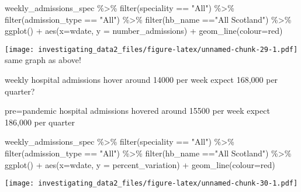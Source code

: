 \documentclass[
]{article}
\newenvironment{Shaded}{\begin{snugshade}}{\end{snugshade}}
\newcommand{\AttributeTok}[1]{\textcolor[rgb]{0.77,0.63,0.00}{#1}}
\newcommand{\FunctionTok}[1]{\textcolor[rgb]{0.00,0.00,0.00}{#1}}
\newcommand{\NormalTok}[1]{#1}
\newcommand{\SpecialCharTok}[1]{\textcolor[rgb]{0.00,0.00,0.00}{#1}}
\newcommand{\StringTok}[1]{\textcolor[rgb]{0.31,0.60,0.02}{#1}}
\begin{document}
\begin{Shaded}
\begin{Highlighting}[]
\NormalTok{weekly\_admissions\_spec }\SpecialCharTok{\%\textgreater{}\%} 
  \FunctionTok{filter}\NormalTok{(speciality }\SpecialCharTok{==} \StringTok{"All"}\NormalTok{) }\SpecialCharTok{\%\textgreater{}\%} 
  \FunctionTok{filter}\NormalTok{(admission\_type }\SpecialCharTok{==} \StringTok{"All"}\NormalTok{) }\SpecialCharTok{\%\textgreater{}\%} 
  \FunctionTok{filter}\NormalTok{(hb\_name }\SpecialCharTok{==}\StringTok{"All Scotland"}\NormalTok{) }\SpecialCharTok{\%\textgreater{}\%} 
\FunctionTok{ggplot}\NormalTok{() }\SpecialCharTok{+}
\FunctionTok{aes}\NormalTok{(}\AttributeTok{x=}\NormalTok{wdate, }\AttributeTok{y =}\NormalTok{ number\_admissions) }\SpecialCharTok{+}
\FunctionTok{geom\_line}\NormalTok{(}\AttributeTok{colour=}\StringTok{\textquotesingle{}red\textquotesingle{}}\NormalTok{) }
\end{Highlighting}
\end{Shaded}

\texttt{[image: investigating\_data2\_files/figure-latex/unnamed-chunk-29-1.pdf]}
same graph as above!

weekly hospital admissions hover around 14000 per week expect 168,000
per quarter?

pre=pandemic hospital admissions hovered around 15500 per week expect
186,000 per quarter

\begin{Shaded}
\begin{Highlighting}[]
\NormalTok{weekly\_admissions\_spec }\SpecialCharTok{\%\textgreater{}\%} 
  \FunctionTok{filter}\NormalTok{(speciality }\SpecialCharTok{==} \StringTok{"All"}\NormalTok{) }\SpecialCharTok{\%\textgreater{}\%} 
  \FunctionTok{filter}\NormalTok{(admission\_type }\SpecialCharTok{==} \StringTok{"All"}\NormalTok{) }\SpecialCharTok{\%\textgreater{}\%} 
  \FunctionTok{filter}\NormalTok{(hb\_name }\SpecialCharTok{==}\StringTok{"All Scotland"}\NormalTok{) }\SpecialCharTok{\%\textgreater{}\%} 
\FunctionTok{ggplot}\NormalTok{() }\SpecialCharTok{+}
\FunctionTok{aes}\NormalTok{(}\AttributeTok{x=}\NormalTok{wdate, }\AttributeTok{y =}\NormalTok{ percent\_variation) }\SpecialCharTok{+}
\FunctionTok{geom\_line}\NormalTok{(}\AttributeTok{colour=}\StringTok{\textquotesingle{}red\textquotesingle{}}\NormalTok{) }
\end{Highlighting}
\end{Shaded}

\texttt{[image: investigating\_data2\_files/figure-latex/unnamed-chunk-30-1.pdf]}
\end{document}

